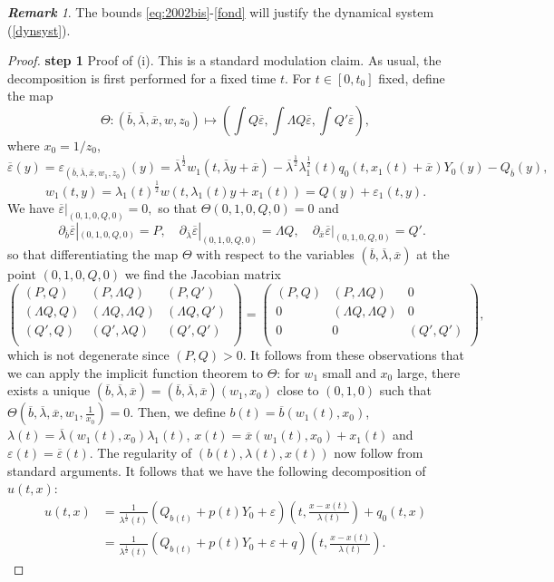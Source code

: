 \documentclass[11pt,a4paper,reqno]{amsart}
\theoremstyle{remark}
\newtheorem{remark}[theorem]{\it \bf{Remark}\/}
\numberwithin{equation}{section}
\def\fref#1{{\rm (\ref{#1})}}
\def\e{\varepsilon}
\def\bar#1{{\overline #1}}
\def\fref#1{{\rm (\ref{#1})}}
\def\l{\lambda}
\def\Yz{Y_0}
\begin{document}
\begin{remark}
The bounds \eqref{eq:2002bis}-\eqref{fond} will justify the dynamical system \fref{dynsyst}.
\end{remark}
  \begin{proof}
  
  {\bf step 1} Proof of  (i). This is a standard modulation claim. As usual, the decomposition is first performed for a fixed time $t$.
  For $t\in [0,t_0]$ fixed, define the map
  $$
 \Theta: (\bar b,\bar \l,\bar x,w,z_0) \mapsto \left( \int Q\bar \e  , \int \Lambda Q \bar \e  ,\int Q' \bar \e  \right),
  $$
  where $x_0=1/z_0$,
  $$
  \bar \e(y)=\e_{(\bar b,{\bar \l},\bar x,w_1,z_0)}(y) =  {\bar \l}^{\frac 12}   w_1\left(t, {\bar \l} y + \bar x\right)  -  {\bar \l}^{\frac 12} {\l_1^{\frac 12}(t)} q_0\left(t,x_1(t) + \bar x\right)\Yz(y)- Q_{\bar b}(y),
  $$
  $$
  w_1(t,y)= { \l_1(t)}^{\frac 12}   w \left(t, {\l_1(t)} y + x_1(t)\right)=Q(y)+\e_1(t,y).
  $$
 We have $\bar \e|_{(0,1,0,Q,0)}=0,$ so that $\Theta(0,1,0,Q,0)=0$ and
 $$
  \quad \partial_{\bar b} \bar \e |_{(0,1,0,Q,0)}= P,
 \quad \partial_{\bar \l} \bar \e|_{(0,1,0,Q,0)}= \Lambda Q,
 \quad \partial_{\bar x} \bar \e|_{(0,1,0,Q,0)}= Q'.
 $$
 so that  differentiating the map $\Theta$ with respect to the variables $(\bar b,\bar \l,\bar x)$
 at the point $(0,1,0,Q,0)$ we find the Jacobian matrix
 $$
 \left(\begin{array}{ ccc }  (P,Q) & (P,\Lambda Q) & (P,Q') \\ (\Lambda Q,Q) & (\Lambda Q,\Lambda Q) & (\Lambda Q,Q') \\   (Q',Q) & (Q',\lambda Q)  & (Q',Q')\\  \end{array}\right)=
  \left(\begin{array}{ ccc }  (P,Q) & (P,\Lambda Q) & 0\\0 & (\Lambda Q,\Lambda Q) &0 \\ 0 & 0  & (Q',Q')\\  \end{array}\right),
 $$
 which is not degenerate since $(P,Q)>0$. It follows from these observations that we can apply the implicit function theorem to $\Theta$: for $w_1$ small and $x_0$ large, there exists
 a unique $(\bar b ,\bar \l , \bar x)=(\bar b ,\bar \l , \bar x)(w_1,x_0)$ close to $(0,1,0)$ such that $\Theta(\bar b,\bar \l,\bar x,w_1,\tfrac 1{x_0})=0$. Then, we  define $b(t)=\bar b(w_1(t),x_0)$, $\l(t)=\bar \l(w_1(t),x_0) \l_1(t)$, $x(t)=\bar x(w_1(t),x_0)+x_1(t)$
 and $\e(t)=\bar \e(t)$.
 The regularity of $(b(t),\l(t),x(t))$   now follow
 from standard arguments.
 It follows  that we have the following decomposition of $u(t,x)$:
\begin{align}
u(t,x) & =  \frac 1{\l^{\frac 12}(t)} \left( Q_{b(t)} + p(t) \Yz+ \e   \right) \left( t,\frac {x-x(t)}{\l(t)}\right)
+q_0(t,x) \label{dec:2}\\
& = \frac 1{\l^{\frac 12}(t)} \left( Q_{b(t)} + p(t) \Yz+ \e + q \right) \left(t, \frac {x-x(t)}{\l(t)}\right)\label{dec:1}.
\end{align}


\end{proof}
\end{document}
